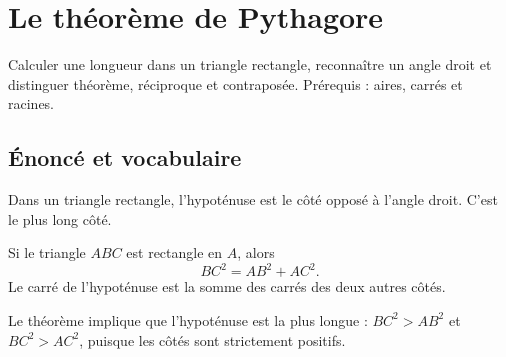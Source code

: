 \documentclass[../cours_3e.tex]{subfiles}
\begin{document}
\setcounter{chapter}{12}
\chapter{Le théorème de Pythagore}
\label{ch:pythagore}
\begin{objectif}
Calculer une longueur dans un triangle rectangle, reconnaître un angle droit et distinguer théorème, réciproque et contraposée. Prérequis : aires, carrés et racines.
\end{objectif}
\section{Énoncé et vocabulaire}
\begin{definition}
Dans un triangle rectangle, l'hypoténuse est le côté opposé à l'angle droit. C'est le plus long côté.
\end{definition}
\begin{theoreme}[Pythagore]
Si le triangle $ABC$ est rectangle en $A$, alors
\[BC^2=AB^2+AC^2.\]
Le carré de l'hypoténuse est la somme des carrés des deux autres côtés.
\end{theoreme}
\begin{center}
\end{center}
Le théorème implique que l'hypoténuse est la plus longue : $BC^2>AB^2$ et $BC^2>AC^2$, puisque les côtés sont strictement positifs.
\end{document}
